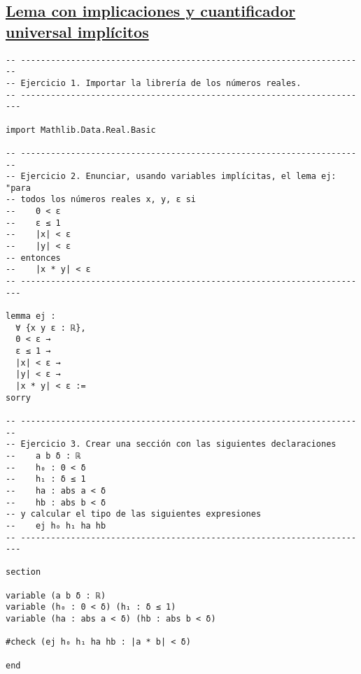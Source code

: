 \subsection{\href{./src/Logica/Lema\_con\_implicaciones\_y\_cuantificador\_universal\_implicitos.lean}{Lema con implicaciones y cuantificador universal implícitos}}
\label{sec:orgc9db7c9}
\begin{verbatim}
-- ---------------------------------------------------------------------
-- Ejercicio 1. Importar la librería de los números reales.
-- ----------------------------------------------------------------------

import Mathlib.Data.Real.Basic

-- ---------------------------------------------------------------------
-- Ejercicio 2. Enunciar, usando variables implícitas, el lema ej: "para
-- todos los números reales x, y, ε si
--    0 < ε
--    ε ≤ 1
--    |x| < ε
--    |y| < ε
-- entonces
--    |x * y| < ε
-- ----------------------------------------------------------------------

lemma ej :
  ∀ {x y ε : ℝ},
  0 < ε →
  ε ≤ 1 →
  |x| < ε →
  |y| < ε →
  |x * y| < ε :=
sorry

-- ---------------------------------------------------------------------
-- Ejercicio 3. Crear una sección con las siguientes declaraciones
--    a b δ : ℝ
--    h₀ : 0 < δ
--    h₁ : δ ≤ 1
--    ha : abs a < δ
--    hb : abs b < δ
-- y calcular el tipo de las siguientes expresiones
--    ej h₀ h₁ ha hb
-- ----------------------------------------------------------------------

section

variable (a b δ : ℝ)
variable (h₀ : 0 < δ) (h₁ : δ ≤ 1)
variable (ha : abs a < δ) (hb : abs b < δ)

#check (ej h₀ h₁ ha hb : |a * b| < δ)

end
\end{verbatim}

